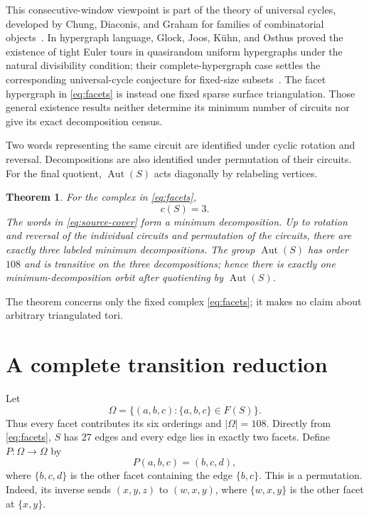 \documentclass[11pt]{article}
\newtheorem{theorem}{Theorem}
\newcommand{\Aut}{\operatorname{Aut}}
\begin{document}
This consecutive-window viewpoint is part of the theory of universal
cycles, developed by Chung, Diaconis, and Graham for families of
combinatorial objects~\cite{ChungDiaconisGraham1992}.  In hypergraph
language, Glock, Joos, K\"uhn, and Osthus proved the existence of tight Euler
tours in quasirandom uniform hypergraphs under the natural divisibility
condition; their complete-hypergraph case settles the corresponding
universal-cycle conjecture for fixed-size subsets~\cite{GlockEtAl2020}.
The facet hypergraph in \eqref{eq:facets} is instead one fixed sparse surface
triangulation.  Those general existence results neither determine its minimum
number of circuits nor give its exact decomposition census.

Two words representing the same circuit are identified under cyclic rotation
and reversal.  Decompositions are also identified under permutation of their
circuits.  For the final quotient, $\Aut(S)$ acts diagonally by relabeling
vertices.

\begin{theorem}\label{thm:main}
For the complex in \eqref{eq:facets},
\[
c(S)=3.
\]
The words in \eqref{eq:source-cover} form a minimum decomposition.  Up to
rotation and reversal of the individual circuits and permutation of the
circuits, there are exactly three labeled minimum decompositions.  The group
$\Aut(S)$ has order $108$ and is transitive on the three decompositions;
hence there is exactly one minimum-decomposition orbit after quotienting by
$\Aut(S)$.
\end{theorem}

The theorem concerns only the fixed complex \eqref{eq:facets}; it makes no
claim about arbitrary triangulated tori.

\section{A complete transition reduction}

Let
\[
\Omega=\{(a,b,c):\{a,b,c\}\in F(S)\}.
\]
Thus every facet contributes its six orderings and $|\Omega|=108$.  Directly
from \eqref{eq:facets}, $S$ has $27$ edges and every edge lies in exactly two
facets.  Define $P:\Omega\to\Omega$ by
\begin{equation}\label{eq:transition}
P(a,b,c)=(b,c,d),
\end{equation}
where $\{b,c,d\}$ is the other facet containing the edge $\{b,c\}$.
This is a permutation.  Indeed, its inverse sends $(x,y,z)$ to $(w,x,y)$,
where $\{w,x,y\}$ is the other facet at $\{x,y\}$.
\end{document}
